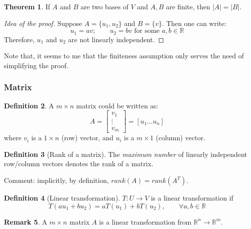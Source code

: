 \documentclass[12pt]{article}
\newcommand{\R}{{\mathbb R}}
\theoremstyle{definition}
\newtheorem{theorem}{Theorem}[section]
\newtheorem{definition}[theorem]{Definition}
\newtheorem{remark}[theorem]{Remark}
\theoremstyle{plain}
\begin{document}
\begin{theorem}
    If $A$ and $B$ are two bases of $V$ and $A, B$ are finite, then $|A| = |B|$.
    \begin{proof}[Idea of the proof]
        Suppose $A = \{ u_1, u_2 \}$ and $B = \{v\}$. Then one can write: 
        \[
            u_1 = a v; \qquad u_2 = bv \text{ for some } a, b\in \R
        \]
        Therefore, $u_1$ and $u_2$ are not linearly independent.
        
    \end{proof}

    Note that, it seems to me that the finiteness assumption only serves the 
    need of simplifying the proof.
\end{theorem}

\subsubsection{Matrix}

\begin{definition}
    A $m \times n$ matrix could be written as: 
    \[
        A = 
    \begin{bmatrix}
        v_1 \\ \vdots \\ v_m
    \end{bmatrix}  = 
    [u_1 \ldots u_n]
    \]
    where $v_i$ is a $1\times n$ (row) vector, and $u_i$ is a $m\times 1$ 
    (column) vector.
\end{definition}

\begin{definition}
    [Rank of a matrix] The \textit{maximum number} of linearly independent 
    row/column vectors denotes the rank of a matrix.

    Comment: implicitly, by definition, $rank(A) = rank(A^T)$.
    
\end{definition}

\setcounter{theorem}{12}
\begin{definition}
    [Linear transformation] $T: U \to V$ is a linear transformation if 
    \[ T(a u_1 + b u_2) =a T(u_1) + b T(u_2)
        , \qquad \forall a,b \in \R
    \]
\end{definition}

\begin{remark}
    A $m \times n$ matrix $A$ is a linear transformation from $\R^n \to \R^m$.
\end{remark}
\end{document}
